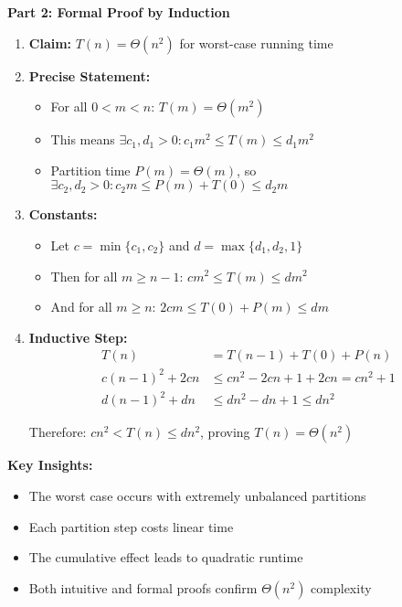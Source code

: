 \textbf{Part 2: Formal Proof by Induction}
\begin{enumerate}[leftmargin=*,noitemsep]
    \item \textbf{Claim:} $T(n) = \Theta(n^2)$ for worst-case running time
    
    \item \textbf{Precise Statement:}
    \begin{itemize}[noitemsep]
        \item For all $0 < m < n$: $T(m) = \Theta(m^2)$
        \item This means $\exists c_1,d_1 > 0: c_1m^2 \leq T(m) \leq d_1m^2$
        \item Partition time $P(m) = \Theta(m)$, so $\exists c_2,d_2 > 0: c_2m \leq P(m) + T(0) \leq d_2m$
    \end{itemize}

    \item \textbf{Constants:}
    \begin{itemize}[noitemsep]
        \item Let $c = \min\{c_1,c_2\}$ and $d = \max\{d_1,d_2,1\}$
        \item Then for all $m \geq n-1$: $cm^2 \leq T(m) \leq dm^2$
        \item And for all $m \geq n$: $2cm \leq T(0) + P(m) \leq dm$
    \end{itemize}

    \item \textbf{Inductive Step:}
    \begin{align*}
        T(n) &= T(n-1) + T(0) + P(n) \\
        c(n-1)^2 + 2cn &\leq cn^2 - 2cn + 1 + 2cn = cn^2 + 1 \\
        d(n-1)^2 + dn &\leq dn^2 - dn + 1 \leq dn^2
    \end{align*}

    Therefore: $cn^2 < T(n) \leq dn^2$, proving $T(n) = \Theta(n^2)$
\end{enumerate}

\textbf{Key Insights:}
\begin{itemize}[noitemsep]
    \item The worst case occurs with extremely unbalanced partitions
    \item Each partition step costs linear time
    \item The cumulative effect leads to quadratic runtime
    \item Both intuitive and formal proofs confirm $\Theta(n^2)$ complexity
\end{itemize}

